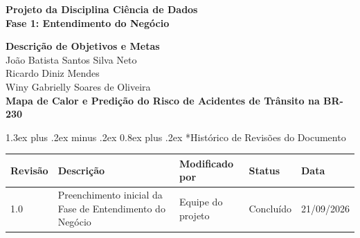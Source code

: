 \documentclass[11pt,a4paper]{article}
\makeatletter
\newcommand{\NomeProjeto}{Mapa de Calor e Predição do Risco de Acidentes de Trânsito na BR-230}
\newcommand{\Componentes}{
João Batista Santos Silva Neto \\
Ricardo Diniz Mendes \\
Winy Gabrielly Soares de Oliveira
}
\renewcommand\section{
\@startsection{section}{1}{0pt}%
{1.3ex plus .2ex minus .2ex}%
{0.8ex plus .2ex}%
{\normalfont\Large\bfseries}
}
\makeatother
\begin{document}

\begin{center}
\vspace*{1.2cm}

{\Large\textbf{Projeto da Disciplina Ciência de Dados}}\\[0.8em]

{\Large\textbf{Fase 1: Entendimento do Negócio}}

\end{center}

\vspace{0.8cm}
\vfill

\begin{center}

{\Huge\textbf{Descrição de Objetivos e Metas}}\\[1.5cm]

{\Large\Componentes}\\[1.5cm]

{\Large\textbf{\NomeProjeto}}

\end{center}

\vfill
\newpage


\section*{Histórico de Revisões do Documento}

\vspace{0.6em}

\begin{center}
\renewcommand{\arraystretch}{1.45}

\begin{tabularx}{\textwidth}
{|p{1.6cm}|X|p{3.2cm}|p{2.8cm}|p{2.2cm}|}

\hline
\textbf{Revisão} &
\textbf{Descrição} &
\textbf{Modificado por} &
\textbf{Status} &
\textbf{Data} \\
\hline

1.0 &
Preenchimento inicial da Fase de Entendimento do Negócio &
Equipe do projeto &
Concluído &
21/09/2026 \\
\hline

\end{tabularx}
\end{center}
\end{document}

